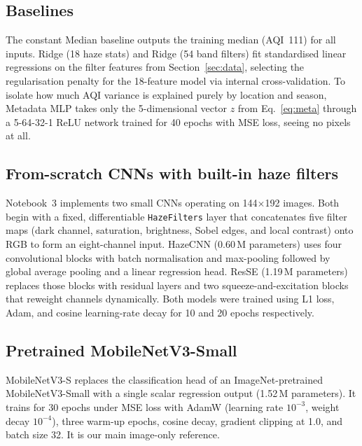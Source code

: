 \documentclass[conference]{IEEEtran}
\begin{document}
\subsection{Baselines}
The constant Median baseline outputs the training median (AQI~111) for all
inputs. Ridge (18 haze stats) and Ridge (54 band filters) fit standardised
linear regressions on the filter features from Section~\ref{sec:data}, selecting
the regularisation penalty for the 18-feature model via internal
cross-validation. To isolate how much AQI variance is explained purely by
location and season, Metadata MLP takes only the 5-dimensional vector $z$ from
Eq.~\eqref{eq:meta} through a 5-64-32-1 ReLU network trained for 40 epochs
with MSE loss, seeing no pixels at all.

\subsection{From-scratch CNNs with built-in haze filters}
Notebook~3 implements two small CNNs operating on 144$\times$192 images. Both
begin with a fixed, differentiable \texttt{HazeFilters} layer that concatenates
five filter maps (dark channel, saturation, brightness, Sobel edges, and local
contrast) onto RGB to form an eight-channel input. HazeCNN (0.60\,M parameters)
uses four convolutional blocks with batch normalisation and max-pooling followed
by global average pooling and a linear regression head. ResSE (1.19\,M
parameters) replaces those blocks with residual layers and two
squeeze-and-excitation blocks that reweight channels dynamically. Both models
were trained using L1 loss, Adam, and cosine learning-rate decay for 10 and 20
epochs respectively.

\subsection{Pretrained MobileNetV3-Small}
MobileNetV3-S replaces the classification head of an ImageNet-pretrained
MobileNetV3-Small \cite{howard2019mobilenetv3} with a single scalar regression
output (1.52\,M parameters). It trains for 30 epochs under MSE loss with AdamW
(learning rate $10^{-3}$, weight decay $10^{-4}$), three warm-up epochs, cosine
decay, gradient clipping at 1.0, and batch size 32. It is our main image-only
reference.
\end{document}
